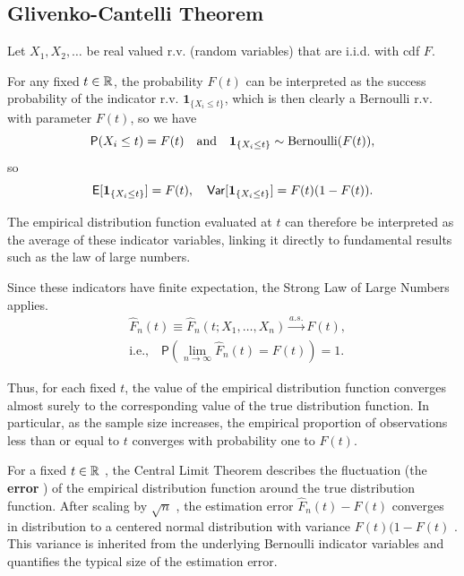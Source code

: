 \subsection{Glivenko-Cantelli Theorem}%
\label{sub:Glivenko-Cantelli Theorem}


Let \(X_1,X_2,\dots \) be real valued r.v. (random variables) that are i.i.d. with cdf \(F\).

For any fixed \(t \in \mathbb{R}\),  the probability \(F(t)\) can be interpreted as the success probability of the indicator r.v. \(\mathbf{1}_{\{X_i \le t\}}\), which is then clearly a Bernoulli r.v. with parameter \(F(t)\), so we have
\[
    \mathsf{P}(X_{i}\le t) = F(t) \quad \text{and}\quad \boldsymbol{1}_{\{X_{i}\le t\}}\sim \text{Bernoulli}(F(t)),
\]
so \[
    \mathsf{E}[\boldsymbol{1}_{\{X_{i}\le t\}}] = F(t),
    \quad 
    \mathsf{Var}[\boldsymbol{1}_{\{X_{i}\le t\}}] = F(t)(1-F(t)).
\]

The empirical distribution function evaluated at \(t\) can therefore be interpreted as the average of these indicator variables, linking it directly to fundamental results such as the law of large numbers.

%

\label{par:Strong law of large numbers:}
Since these indicators have finite expectation, the Strong Law of Large Numbers applies.
\begin{align*}
    &\hat{F}_{n}(t) \equiv \hat{F}_{n}(t;X_1,\dots ,X_{n}) \overset{a.s.}{\longrightarrow}F(t), \\
    &\text{i.e.,}\quad \mathsf{P}\left( \lim\limits_{n \to \infty} \hat{F}_{n}(t) = F(t) \right) =1.
\end{align*}

Thus, for each fixed \(t\), the value of the empirical distribution function converges almost surely to the corresponding value of the true distribution function. In particular, as the sample size increases, the empirical proportion of observations less than or equal to \(t\) converges with probability one to \(F(t)\).

%
\label{par:Central limit theorem:}

For a fixed 
\(t \in \mathbb{R}\)
, the Central Limit Theorem describes the fluctuation (the \textbf{error} ) of the empirical distribution function around the true distribution function. After scaling by 
\(\sqrt{n} \)
, the estimation error 
\(\hat{F}_{n}(t) - F(t)\)
converges in distribution to a centered normal distribution with variance 
\(F(t)(1-F(t)\)
. 
This variance is inherited from the underlying Bernoulli indicator variables and quantifies the typical size of the estimation error.

